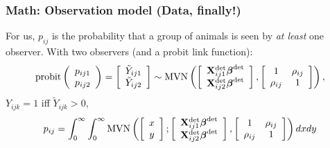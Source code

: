 \documentclass[serif,mathserif]{beamer}
\begin{document}
\begin{frame}
  \frametitle{Math: Observation model (Data, finally!)}
        For us, $p_{ij}$ is the probability that a group of animals is seen by {\it at least} one observer.  With two observers (and a probit link function):
         $$
        {\rm probit} \left(\begin{array}{c}
        				p_{ij1} \\
        				p_{ij2}
        		\end{array}\right) = \left[\begin{array}{c}
        				\tilde{Y}_{ij1} \\
        				\tilde{Y}_{ij2}
        		\end{array}\right] \sim {\rm MVN}
        \left( \left[ \begin{array}{c}
        				{\bf X}_{ij1}^{\rm det} \boldsymbol{\beta}^{\rm det}\\
        				{\bf X}_{ij2}^{\rm det} \boldsymbol{\beta}^{\rm det}
        		\end{array}\right],
                \left[ \begin{array}{cc}
                    1 & \rho_{ij} \\
                    \rho_{ij} & 1
                \end{array} \right]
        \right),
        $$
        $Y_{ijk}=1$ iff $\tilde{Y}_{ijk}>0$,
       $$
          p_{ij} = \int_0^\infty \int_0^\infty {\rm MVN}
            \left( \left[ \begin{array}{c}
    				x\\
    				y
    		\end{array} \right]; \left[
            \begin{array}{c}
    				{\bf X}_{ij1}^{\rm det} \boldsymbol{\beta}^{\rm
                    det}\\
    				{\bf X}_{ij2}^{\rm det} \boldsymbol{\beta}^{\rm
                    det}
    		\end{array}\right],
            \left[ \begin{array}{cc}
                1 & \rho_{ij} \\
                \rho_{ij} & 1
            \end{array} \right]
            \right) dx dy
        $$
\end{frame}
\end{document}
